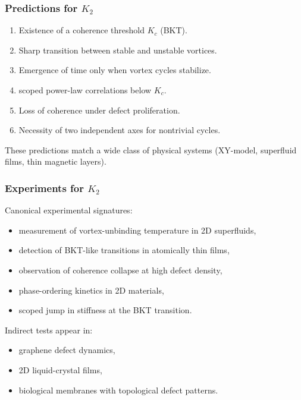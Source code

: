 \subsubsection{Predictions for \texorpdfstring{$K_2$}{K_2}}

\begin{enumerate}
    \item Existence of a coherence threshold $K_c$ (BKT).
    \item Sharp transition between stable and unstable vortices.
    \item Emergence of time only when vortex cycles stabilize.
    \item scoped power-law correlations below $K_c$.
    \item Loss of coherence under defect proliferation.
    \item Necessity of two independent axes for nontrivial cycles.
\end{enumerate}

These predictions match a wide class of physical systems (XY-model,
superfluid films, thin magnetic layers).

\subsubsection{Experiments for \texorpdfstring{$K_2$}{K_2}}

Canonical experimental signatures:
\begin{itemize}
    \item measurement of vortex-unbinding temperature in 2D superfluids,
    \item detection of BKT-like transitions in atomically thin films,
    \item observation of coherence collapse at high defect density,
    \item phase-ordering kinetics in 2D materials,
    \item scoped jump in stiffness at the BKT transition.
\end{itemize}

Indirect tests appear in:
\begin{itemize}
    \item graphene defect dynamics,
    \item 2D liquid-crystal films,
    \item biological membranes with topological defect patterns.
\end{itemize}

